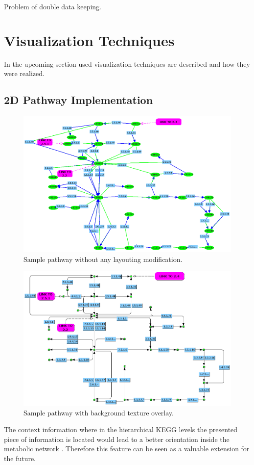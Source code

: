 Problem of double data keeping. 

\section{Visualization Techniques}

In the upcoming section used visualization techniques are described and how they were realized.

\subsection{2D Pathway Implementation}

\begin{figure}[ht]
  \centering
    \includegraphics[width=0.7\linewidth]{gfx/sample_pathway_jgraph}
  \caption{Sample pathway without any layouting modification.}
  \label{fig:sample_pathway_jgraph}
\end{figure}

\begin{figure}[ht]
  \centering
    \includegraphics[width=0.7\linewidth]{gfx/sample_pathway_jgraph_background}
  \caption{Sample pathway with background texture overlay.}
  \label{fig:sample_pathway_jgraph_background}
\end{figure}

The context information where in the hierarchical KEGG levels the presented piece of information is located would lead to a better orientation inside the metabolic network \citep{Jourdan2003}. Therefore this feature can be seen as a valuable extension for the future. 

